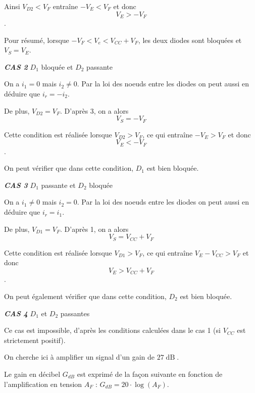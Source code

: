 \documentclass[a4paper,french]{paper}
\begin{document}
Ainsi $V_{D2} < V_F$ entraîne $- V_E < V_F$ et donc $$\boxed{V_E > - V_F}$$.

\medskip

Pour résumé, lorsque $ - V_F < V_e < V_{CC} + V_F $, les deux diodes sont bloquées et $V_S = V_E$.

\bigskip

\textbf{\textit{CAS 2}} $D_1$ bloquée et $D_2$ passante

On a $i_1 = 0$ mais $i_2 \neq 0$. Par la loi des noeuds entre les diodes on peut aussi en déduire que $i_r = -i_2$.

De plus, $V_{D2} = V_F$. D'après 3, on a alors $$\boxed{V_S = -V_F}$$

Cette condition est réalisée lorsque $V_{D2} > V_F$, ce qui entraîne $- V_E > V_F$ et donc $$\boxed{V_E < - V_F}$$.

On peut vérifier que dans cette condition, $D_1$ est bien bloquée.

\bigskip

\textbf{\textit{CAS 3}} $D_1$ passante et $D_2$ bloquée

On a $i_1 \neq 0$ mais $i_2 = 0$. Par la loi des noeuds entre les diodes on peut aussi en déduire que $i_r = i_1$.

De plus, $V_{D1} = V_F$. D'après 1, on a alors $$\boxed{V_S = V_{CC} + V_F}$$

Cette condition est réalisée lorsque $V_{D1} > V_F$, ce qui entraîne $V_E - V_{CC} > V_F$ et donc $$\boxed{V_E > V_{CC} + V_F}$$.

On peut également vérifier que dans cette condition, $D_2$ est bien bloquée.

\bigskip

\textbf{\textit{CAS 4}} $D_1$ et $D_2$ passantes

Ce cas est impossible, d'après les conditions calculées dans le cas 1 (si $V_{CC}$ est strictement positif).

\newpage

On cherche ici à amplifier un signal d'un gain de $27\operatorname{dB}$.

Le gain en décibel $G_{dB}$ est exprimé de la façon suivante en fonction de l'amplification en tension $A_{F}$ : $G_{dB} = 20 \cdot \log(A_F)$.
\end{document}

